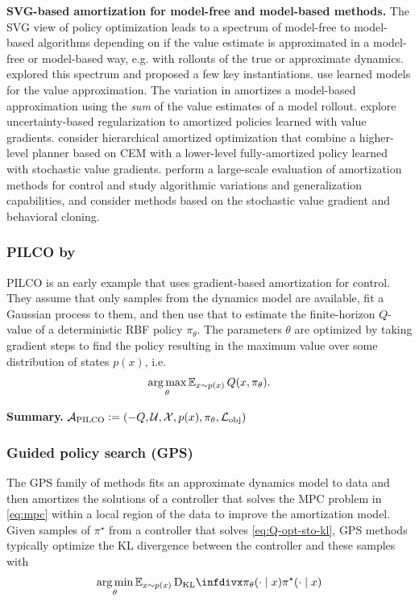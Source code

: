 \documentclass[twoside,11pt]{article}
\newcommand{\eg}{e.g.\xspace}
\newcommand{\ie}{i.e.\xspace}
\begin{document}
\textbf{SVG-based amortization for model-free and model-based methods.}
The SVG view of policy optimization leads to a spectrum of model-free
to model-based algorithms depending on if the value estimate is
approximated in a model-free or model-based way, \eg with rollouts
of the true or approximate dynamics.
\citet{heess2015learning} explored this spectrum and proposed
a few key instantiations.
\citet{byravan2019imagined,amos2021model} use learned
models for the value approximation.
The variation in \citet{hafner2019dream} amortizes a model-based
approximation using the \emph{sum} of the value estimates
of a model rollout.
\citet{henaff2019model} explore uncertainty-based regularization to
amortized policies learned with value gradients.
\citet{xie2020latent} consider hierarchical amortized optimization
that combine a higher-level planner based on CEM with a
lower-level fully-amortized policy learned
with stochastic value gradients.
\citet{byravan2021evaluating} perform a large-scale evaluation of
amortization methods for control and study algorithmic variations
and generalization capabilities, and consider methods based on
the stochastic value gradient and behavioral cloning.

\subsubsection{PILCO by \citet{deisenroth2011pilco}}
PILCO is an early example that uses gradient-based
amortization for control.
They assume that only samples from the dynamics model are
available, fit a Gaussian process to them, and then use that
to estimate the finite-horizon $Q$-value of a
deterministic RBF policy $\pi_\theta$.
The parameters $\theta$ are optimized by taking gradient
steps to find the policy resulting in the maximum value
over some distribution of states $p(x)$, \ie
\begin{equation}
  \operatorname*{arg\,max}_\theta \operatorname{\mathbb{E}}_{x\sim p(x)} Q(x, \pi_\theta).
\end{equation}

\textbf{Summary.}
${\mathcal{A}}_{\rm PILCO}\vcentcolon= (-Q, {\mathcal{U}}, {\mathcal{X}}, p(x), \pi_\theta, {\mathcal{L}}_{\rm obj})$

\subsubsection{Guided policy search (GPS)}
The GPS family of methods
\citep{levine2013guided,levine2014learning,levine2016end,montgomery2016guided}
fits an approximate dynamics model to data and then
amortizes the solutions of a controller that solves
the MPC problem in \cref{eq:mpc} within a local region of
the data to improve the amortization model.
Given samples of $\pi^\star$ from a controller that solves
\cref{eq:Q-opt-sto-kl},
GPS methods typically optimize the KL divergence between
the controller and these samples with
\begin{equation}
  \argmin_\theta \E_{x\sim p(x)} \kl{\pi_\theta(\cdot\mid x)}{\pi^\star(\cdot\mid x)}
  \label{eq:gps}
\end{equation}
\end{document}
